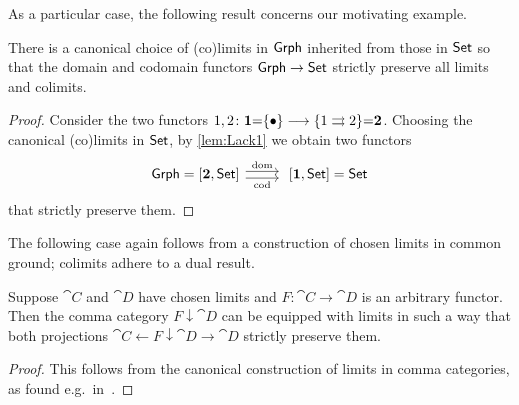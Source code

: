 \documentclass{amsart}
\begin{document}
As a particular case, the following result concerns our motivating example.
\begin{cor}
There is a canonical choice of (co)limits in $\mathsf{Grph}$ inherited from those in $\mathsf{Set}$ so that the domain and codomain functors $\mathsf{Grph}\to\mathsf{Set}$ strictly preserve all limits and colimits.
\end{cor}

\begin{proof}
 Consider the two functors $1,2\colon\mathbf{1}{=}\{\bullet\}\longrightarrow\{1\rightrightarrows2\}{=}\mathbf{2}$. Choosing the canonical (co)limits in $\mathsf{Set}$, by \cref{lem:Lack1} we obtain two functors
\begin{displaymath}
\begin{tikzcd}
 \Grph=[\two,\Set]\ar[r,shift left,"\mathrm{dom}"]\ar[r,shift right,"\mathrm{cod}"'] & \;[\one,\Set]=\Set
 \end{tikzcd}
\end{displaymath}
that strictly preserve them.
\end{proof}

The following case again follows from a construction of chosen limits in common ground; colimits adhere to a dual result.
\begin{lem}
Suppose $\cat{C}$ and $\cat{D}$ have chosen limits and $F\colon\cat{C}\to\cat{D}$ is an arbitrary functor. Then the comma category $F\downarrow\cat{D}$ can be equipped with limits in such a way that both projections $\cat{C}\leftarrow F\downarrow\cat{D}\to\cat{D}$ strictly preserve them.
\end{lem}

\begin{proof}
 This follows from the canonical construction of limits in comma categories, as found e.g.\ in~\cite[\S 2.16]{Handbook1}.
\end{proof}
\end{document}
